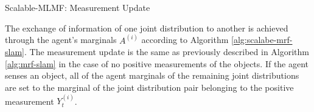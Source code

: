 \begin{center}
\begin{minipage}{\linewidth}

\begin{algorithm}[H]
\label{alg:scalabe-mrf-slam}
\BlankLine

\caption{Scalable-MLMF: Measurement Update}
\end{algorithm} 
\end{minipage}
\end{center}

The exchange of information of one joint distribution to another is achieved through the agent's marginals $A^{(i)}$ according to Algorithm \ref{alg:scalabe-mrf-slam}.
The measurement update is the same as previously described in Algorithm \ref{alg:mrf-slam} in the case of no positive measurements of the objects. If the agent
senses an object, all of the agent marginals of the remaining joint distributions are set to the marginal of the joint distribution pair belonging to the positive 
measurement $Y^{(i)}_t$. 

